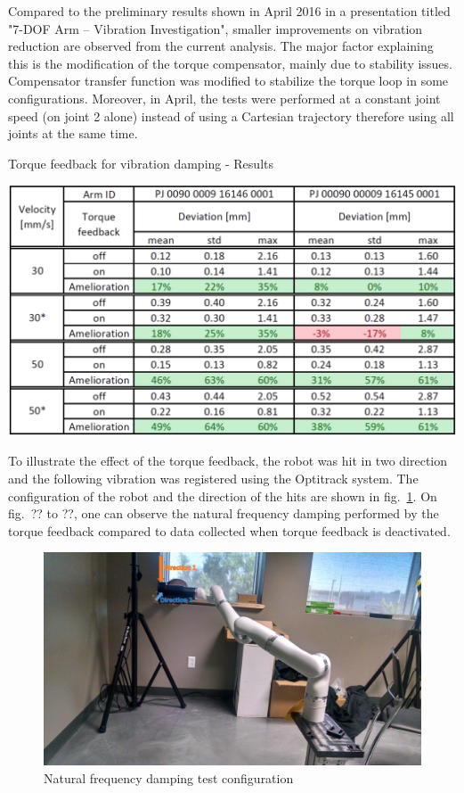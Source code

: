 Compared to the preliminary results shown in April 2016 in a presentation titled "7-DOF Arm – Vibration Investigation", smaller improvements on vibration reduction are observed from the current analysis. The major factor explaining this is the modification of the torque compensator, mainly due to stability issues. Compensator transfer function was modified to stabilize the torque loop in some configurations. Moreover, in April, the tests were performed at a constant joint speed (on joint 2 alone) instead of using a Cartesian trajectory therefore using all joints at the same time.

\begin{table}[t]
	\centering
	\caption{Torque feedback for vibration damping - Results}
	\includegraphics[width=.8\textwidth]{./images/Results.pdf}
	\label{table:results_torque}
\end{table}

To illustrate the effect of the torque feedback, the robot was hit in two direction and the following vibration was registered using the Optitrack system. The configuration of the robot and the direction of the hits are shown in fig.~\ref{fig:hitConfig}. On fig.~?? to ??, one can observe the natural frequency damping performed by the torque feedback compared to data collected when torque feedback is deactivated. 

\begin{figure}
	\begin{center}
		\includegraphics[width=1\textwidth]{./images/naturalVib.pdf}%
		\caption{Natural frequency damping test configuration}
		\label{fig:hitConfig}
	\end{center}
\end{figure}